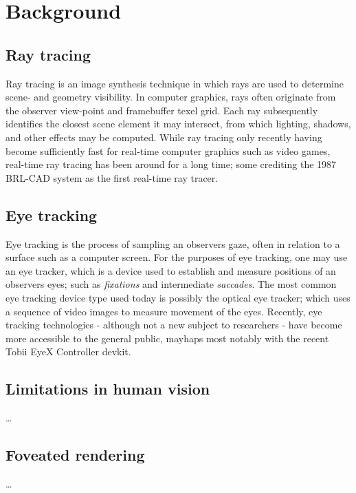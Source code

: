\section{Background}
\subsection{Ray tracing}
Ray tracing is an image synthesis technique in which rays are used to determine scene- and geometry visibility.
In computer graphics, rays often originate from the observer view-point and framebuffer texel grid.
Each ray subsequently identifies the closest scene element it may intersect, from which lighting, shadows, and other effects may be computed.
While ray tracing only recently having become sufficiently fast for real-time computer graphics such as video games, real-time ray tracing has been around for a long time; some crediting the 1987 BRL-CAD system as the first real-time ray tracer\cite{stay87}.

\subsection{Eye tracking}
Eye tracking is the process of sampling an observers gaze, often in relation to a surface such as a computer screen.
For the purposes of eye tracking, one may use an eye tracker, which is a device used to establish and measure positions of an observers eyes\cite{duchowski07}; such as \textit{fixations} and intermediate \textit{saccades}\cite{rayner98}.
The most common eye tracking device type used today is possibly the optical eye tracker; which uses a sequence of video images to measure movement of the eyes\cite{duchowski07}.
Recently, eye tracking technologies - although not a new subject to researchers - have become more accessible to the general public, mayhaps most notably with the recent Tobii EyeX Controller devkit.

\subsection{Limitations in human vision}
\ldots

\subsection{Foveated rendering}
\ldots
